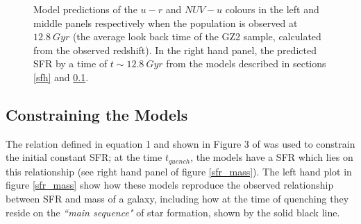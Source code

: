 \documentclass{mn2e}
\begin{document}
\begin{figure}
\caption{Model predictions of the $u-r$ and $NUV-u$ colours in the left and  middle panels respectively when the population is observed at $12.8~Gyr$ (the average look back time of the GZ2 sample, calculated from the observed redshift). In the right hand panel, the predicted SFR by a time of $t \sim 12.8 ~Gyr$  from the models described in sections \ref{sfh} and \ref{pengsfr}.}
\label{pred}
\end{figure}

\subsection{Constraining the Models}\label{pengsfr}
The relation defined in equation 1 and shown in Figure 3 of \citet{Peng} was used to constrain the initial constant SFR; at the time $t_{quench}$, the models have a SFR which lies on this relationship (see right hand panel of figure \ref{sfr_mass}). The left hand plot in figure \ref{sfr_mass} show how these models reproduce the observed relationship between SFR and mass of a galaxy, including how at the time of quenching they reside on the \emph{``main sequence"} of star formation, shown by the solid black line.  
\end{document}
